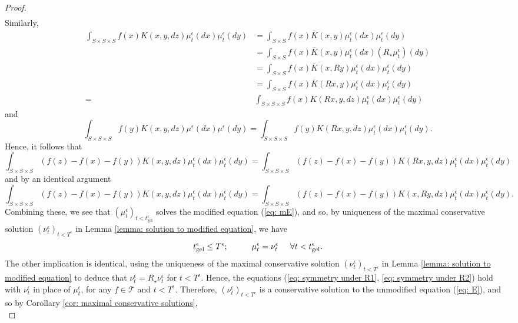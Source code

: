 \begin{proof}
\begin{equation}
\begin{split}
    \end{split} \end{equation} Similarly, \begin{equation} \begin{split}
        \int_{S\times S\times S} f(x)K(x,y,dz)\mu^\epsilon_t(dx)\mu^\epsilon_t(dy)& = \int_{S\times S} f(x)\overline{K}(x,y)\mu^\epsilon_t(dx)\mu^\epsilon_t(dy) \\ &=\int_{S\times S} f(x)\overline{K}(x,y)\mu^\epsilon_t(dx)(R_\star\mu^\epsilon_t)(dy) \\& = \int_{S\times S} f(x)\overline{K}(x,Ry)\mu^\epsilon_t(dx)\mu^\epsilon_t(dy)\\& = \int_{S\times S} f(x)\overline{K}(Rx,y)\mu^\epsilon_t(dx)\mu^\epsilon_t(dy)\\ = &\int_{S\times S\times S} f(x)K(Rx,y,dz)\mu^\epsilon_t(dx)\mu^\epsilon_t(dy)
    \end{split} \end{equation} and \begin{equation}
        \int_{S\times S \times S} f(y)K(x,y,dz)\mu^\epsilon(dx)\mu^\epsilon(dy)=\int_{S\times S \times S} f(y)K(Rx,y,dz)\mu^\epsilon_t(dx)\mu^\epsilon_t(dy). 
    \end{equation} Hence, it follows that \begin{equation}\label{eq: symmetry under R1}
        \int_{S\times S\times S} (f(z)-f(x)-f(y))K(x,y,dz)\mu^\epsilon_t(dx)\mu^\epsilon_t(dy) =  \int_{S\times S\times S} (f(z)-f(x)-f(y))K(Rx,y,dz)\mu^\epsilon_t(dx)\mu^\epsilon_t(dy)
    \end{equation} and by an identical argument \begin{equation}\label{eq: symmetry under R2}
        \int_{S\times S\times S} (f(z)-f(x)-f(y))K(x,y,dz)\mu^\epsilon_t(dx)\mu^\epsilon_t(dy) =  \int_{S\times S\times S} (f(z)-f(x)-f(y))K(x,Ry,dz)\mu^\epsilon_t(dx)\mu^\epsilon_t(dy).
    \end{equation} Combining these, we see that $(\mu^\epsilon_t)_{t<t^\epsilon_\text{gel}}$ solves the modified equation (\ref{eq: mE}), and so, by uniqueness of the maximal conservative solution $(\nu^\epsilon_t)_{t<T^\epsilon}$ in Lemma \ref{lemma: solution to modified equation}, we have \begin{equation}
        t^\epsilon_\text{gel} \leq T^\epsilon; \hspace{1cm} \mu^\epsilon_t=\nu^\epsilon_t \hspace{0.5cm}\forall t<t^\epsilon_\text{gel}.
    \end{equation} The other implication is identical, using the uniqueness of the maximal conservative solution $(\nu^\epsilon_t)_{t<T^\epsilon}$ in Lemma \ref{lemma: solution to modified equation} to deduce that $\nu^\epsilon_t=R_\star \nu^\epsilon_t$ for $t<T^\epsilon$. Hence, the equations (\ref{eq: symmetry under R1}, \ref{eq: symmetry under R2}) hold with $\nu^\epsilon_t$ in place of $\mu^\epsilon_t$, for any $f\in \mathcal{T}$ and $t<T^\epsilon.$ Therefore, $(\nu^\epsilon_t)_{t<T^\epsilon}$ is a conservative solution to the unmodified equation (\ref{eq: E}), and so by Corollary \ref{cor: maximal conservative solutions}, \begin{equation}

\end{equation}
\end{proof}
